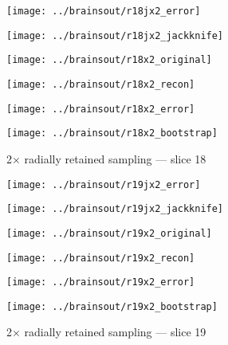 \documentclass[review,supplement,onefignum,onetabnum,juq]{siamonline181217}
\begin{document}
\begin{figure}
\begin{centering}

\parbox{\imsize}{\texttt{[image: ../brainsout/r18jx2\_error]}}
\parbox{\imsize}{\texttt{[image: ../brainsout/r18jx2\_jackknife]}}

\vspace{\vertsep}

\parbox{\imsize}{\texttt{[image: ../brainsout/r18x2\_original]}}
\parbox{\imsize}{\texttt{[image: ../brainsout/r18x2\_recon]}}

\vspace{\vertsep}

\parbox{\imsize}{\texttt{[image: ../brainsout/r18x2\_error]}}
\parbox{\imsize}{\texttt{[image: ../brainsout/r18x2\_bootstrap]}}

\end{centering}
\caption{2$\times$ radially retained sampling --- slice 18}
\end{figure}


\begin{figure}
\begin{centering}

\parbox{\imsize}{\texttt{[image: ../brainsout/r19jx2\_error]}}
\parbox{\imsize}{\texttt{[image: ../brainsout/r19jx2\_jackknife]}}

\vspace{\vertsep}

\parbox{\imsize}{\texttt{[image: ../brainsout/r19x2\_original]}}
\parbox{\imsize}{\texttt{[image: ../brainsout/r19x2\_recon]}}

\vspace{\vertsep}

\parbox{\imsize}{\texttt{[image: ../brainsout/r19x2\_error]}}
\parbox{\imsize}{\texttt{[image: ../brainsout/r19x2\_bootstrap]}}

\end{centering}
\caption{2$\times$ radially retained sampling --- slice 19}
\end{figure}
\end{document}
